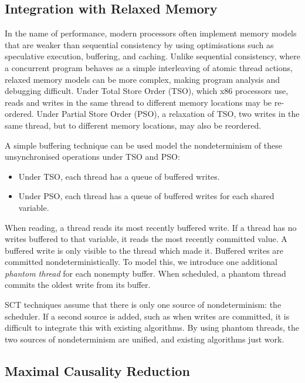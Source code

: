 \subsection{Integration with Relaxed Memory}

In the name of performance, modern processors often implement memory models that
are weaker than sequential consistency\cite{lamport1979} by using optimisations
such as speculative execution, buffering, and caching.  Unlike sequential
consistency, where a concurrent program behaves as a simple interleaving of
atomic thread actions, relaxed memory models can be more complex, making program
analysis and debugging difficult.  Under Total Store Order (TSO), which x86
processors use\cite{owens2009}, reads and writes in the same thread to different
memory locations may be re-ordered.  Under Partial Store Order (PSO), a
relaxation of TSO\cite{sparc}, two writes in the same thread, but to different
memory locations, may also be reordered.

A simple buffering technique can be used model the nondeterminism of
these unsynchronised operations under TSO and PSO\cite{zhang2015}:

\begin{itemize}
\item Under TSO, each thread has a queue of buffered writes.
\item Under PSO, each thread has a queue of buffered writes for each shared
variable.
\end{itemize}

When reading, a thread reads its most recently buffered write.  If a
thread has no writes buffered to that variable, it reads the most
recently committed value.  A buffered write is only visible to the
thread which made it.  Buffered writes are committed
nondeterministically.  To model this, we introduce one additional
\emph{phantom thread} for each nonempty buffer.  When scheduled, a
phantom thread commits the oldest write from its buffer.

SCT techniques assume that there is only one source of nondeterminism: the
scheduler.  If a second source is added, such as when writes are committed, it
is difficult to integrate this with existing algorithms.  By using phantom
threads, the two sources of nondeterminism are unified, and existing algorithms
just work\cite{zhang2015}.

\subsection{Maximal Causality Reduction}


